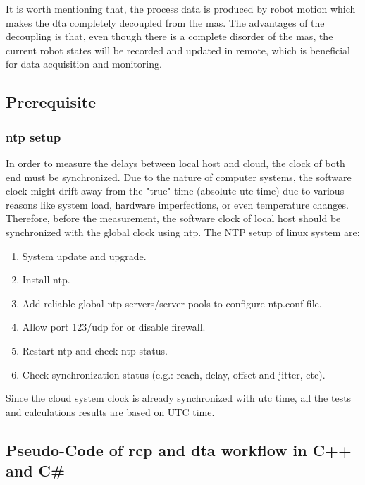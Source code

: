 It is worth mentioning that, the process data is produced by robot motion which makes the \gls{dta} completely decoupled from the \gls{mas}. 
The advantages of the decoupling is that, even though there is a complete disorder of the \gls{mas}, the current robot states will be recorded and updated in remote, 
which is beneficial for data acquisition and monitoring. 



\subsection{Prerequisite} \label{chap: ntpsetup}
\subsubsection{\gls{ntp} setup}
In order to measure the delays between local host and cloud, the clock of both end must be synchronized. 
Due to the nature of computer systems, the software clock might drift away from the "true" time (absolute \gls{utc} time) due to various reasons like system load, hardware imperfections, or even temperature changes.
Therefore, before the measurement, the software clock of local host should be synchronized with the global clock using \gls{ntp}. 
The NTP setup of linux system are:  

\begin{enumerate}
    \item System update and upgrade.
    \item Install \gls{ntp}.
    \item Add reliable global \gls{ntp} servers/server pools to configure ntp.conf file.
    \item Allow port 123/udp for or disable firewall.
    \item Restart \gls{ntp} and check \gls{ntp} status.
    \item Check synchronization status (e.g.: reach, delay, offset and jitter, etc).
    \end{enumerate}

Since the cloud system clock is already synchronized with \gls{utc} time, all the tests and calculations results are based on UTC time. 

\subsection{Pseudo-Code of \gls{rcp} and \gls{dta} workflow in C++ and C\#}\label{chap: RCPDTAPseudo}

